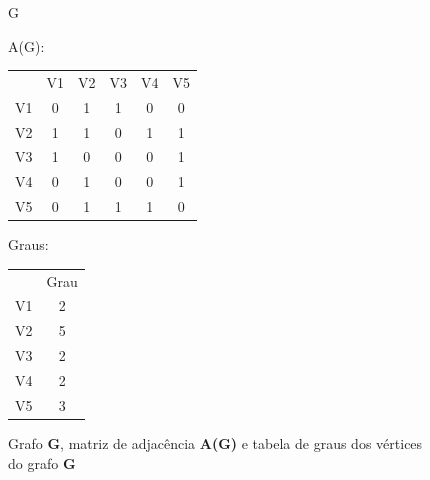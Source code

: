 \documentclass[a4paper, 12pt]{article}
\begin{document}
    \begin{figure}[hbt!]
        \begin{multicols}{2}
            \begin{center}
            G
            \end{center}
        
            A(G):
            \begin{tabular}{cccccc}
                & V1 & V2 & V3 & V4 & V5 \\
                V1 & 0  & 1  & 1  & 0  & 0  \\
                V2 & 1  & 1  & 0  & 1  & 1  \\
                V3 & 1  & 0  & 0  & 0  & 1  \\
                V4 & 0  & 1  & 0  & 0  & 1  \\
                V5 & 0  & 1  & 1  & 1  & 0 
            \end{tabular}
            
            \vspace{0.4in}
            Graus:
            \begin{tabular}{cc}
                & Grau \\
                V1 & 2    \\
                V2 & 5    \\
                V3 & 2    \\
                V4 & 2    \\
                V5 & 3   
            \end{tabular}
        \end{multicols}
        \caption{Grafo \textbf{G}, matriz de adjacência \textbf{A(G)} e tabela de graus dos vértices do grafo \textbf{G}}
    \end{figure}
    
\end{document}
